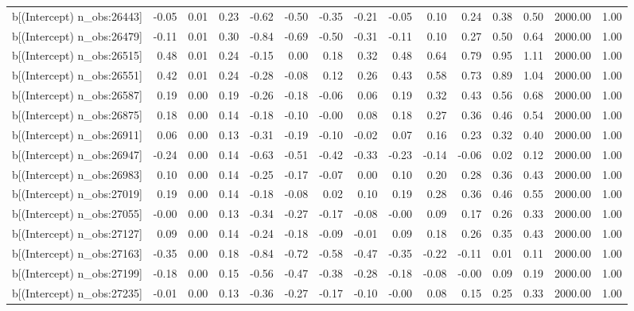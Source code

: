\begin{table}[ht]
\begin{tabular}{rrrrrrrrrrrrrrr}
  b[(Intercept) n\_obs:26443] & -0.05 & 0.01 & 0.23 & -0.62 & -0.50 & -0.35 & -0.21 & -0.05 & 0.10 & 0.24 & 0.38 & 0.50 & 2000.00 & 1.00 \\ 
  b[(Intercept) n\_obs:26479] & -0.11 & 0.01 & 0.30 & -0.84 & -0.69 & -0.50 & -0.31 & -0.11 & 0.10 & 0.27 & 0.50 & 0.64 & 2000.00 & 1.00 \\ 
  b[(Intercept) n\_obs:26515] & 0.48 & 0.01 & 0.24 & -0.15 & 0.00 & 0.18 & 0.32 & 0.48 & 0.64 & 0.79 & 0.95 & 1.11 & 2000.00 & 1.00 \\ 
  b[(Intercept) n\_obs:26551] & 0.42 & 0.01 & 0.24 & -0.28 & -0.08 & 0.12 & 0.26 & 0.43 & 0.58 & 0.73 & 0.89 & 1.04 & 2000.00 & 1.00 \\ 
  b[(Intercept) n\_obs:26587] & 0.19 & 0.00 & 0.19 & -0.26 & -0.18 & -0.06 & 0.06 & 0.19 & 0.32 & 0.43 & 0.56 & 0.68 & 2000.00 & 1.00 \\ 
  b[(Intercept) n\_obs:26875] & 0.18 & 0.00 & 0.14 & -0.18 & -0.10 & -0.00 & 0.08 & 0.18 & 0.27 & 0.36 & 0.46 & 0.54 & 2000.00 & 1.00 \\ 
  b[(Intercept) n\_obs:26911] & 0.06 & 0.00 & 0.13 & -0.31 & -0.19 & -0.10 & -0.02 & 0.07 & 0.16 & 0.23 & 0.32 & 0.40 & 2000.00 & 1.00 \\ 
  b[(Intercept) n\_obs:26947] & -0.24 & 0.00 & 0.14 & -0.63 & -0.51 & -0.42 & -0.33 & -0.23 & -0.14 & -0.06 & 0.02 & 0.12 & 2000.00 & 1.00 \\ 
  b[(Intercept) n\_obs:26983] & 0.10 & 0.00 & 0.14 & -0.25 & -0.17 & -0.07 & 0.00 & 0.10 & 0.20 & 0.28 & 0.36 & 0.43 & 2000.00 & 1.00 \\ 
  b[(Intercept) n\_obs:27019] & 0.19 & 0.00 & 0.14 & -0.18 & -0.08 & 0.02 & 0.10 & 0.19 & 0.28 & 0.36 & 0.46 & 0.55 & 2000.00 & 1.00 \\ 
  b[(Intercept) n\_obs:27055] & -0.00 & 0.00 & 0.13 & -0.34 & -0.27 & -0.17 & -0.08 & -0.00 & 0.09 & 0.17 & 0.26 & 0.33 & 2000.00 & 1.00 \\ 
  b[(Intercept) n\_obs:27127] & 0.09 & 0.00 & 0.14 & -0.24 & -0.18 & -0.09 & -0.01 & 0.09 & 0.18 & 0.26 & 0.35 & 0.43 & 2000.00 & 1.00 \\ 
  b[(Intercept) n\_obs:27163] & -0.35 & 0.00 & 0.18 & -0.84 & -0.72 & -0.58 & -0.47 & -0.35 & -0.22 & -0.11 & 0.01 & 0.11 & 2000.00 & 1.00 \\ 
  b[(Intercept) n\_obs:27199] & -0.18 & 0.00 & 0.15 & -0.56 & -0.47 & -0.38 & -0.28 & -0.18 & -0.08 & -0.00 & 0.09 & 0.19 & 2000.00 & 1.00 \\ 
  b[(Intercept) n\_obs:27235] & -0.01 & 0.00 & 0.13 & -0.36 & -0.27 & -0.17 & -0.10 & -0.00 & 0.08 & 0.15 & 0.25 & 0.33 & 2000.00 & 1.00 \\ 

\end{tabular}
\end{table}
